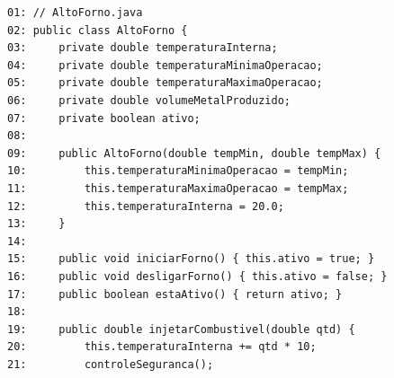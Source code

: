 \documentclass[12pt,a4paper]{article}
\begin{document}
\begin{enumerate}
    \begin{center}
    \end{center}
\begin{small}
\begin{lstlisting}
01: // AltoForno.java
02: public class AltoForno {
03:     private double temperaturaInterna;
04:     private double temperaturaMinimaOperacao;
05:     private double temperaturaMaximaOperacao;
06:     private double volumeMetalProduzido;
07:     private boolean ativo;
08: 
09:     public AltoForno(double tempMin, double tempMax) {
10:         this.temperaturaMinimaOperacao = tempMin;
11:         this.temperaturaMaximaOperacao = tempMax;
12:         this.temperaturaInterna = 20.0;
13:     }
14: 
15:     public void iniciarForno() { this.ativo = true; }
16:     public void desligarForno() { this.ativo = false; }
17:     public boolean estaAtivo() { return ativo; }
18: 
19:     public double injetarCombustivel(double qtd) {
20:         this.temperaturaInterna += qtd * 10;
21:         controleSeguranca();

\end{lstlisting}
\end{small}
\end{enumerate}
\end{document}
